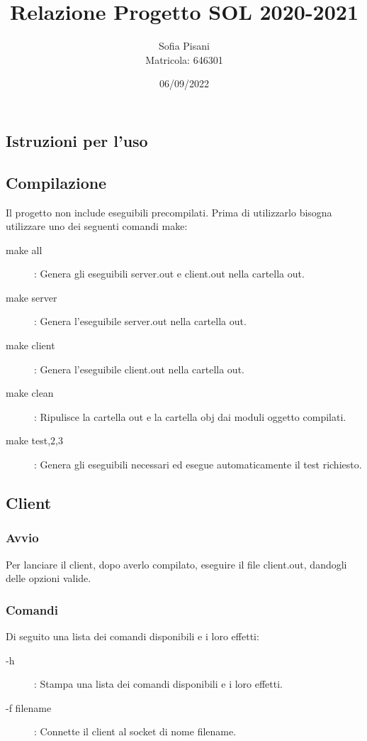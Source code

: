 \documentclass[11pt]{article}
\title{Relazione Progetto SOL 2020-2021}
\date{06/09/2022}
\author{Sofia Pisani \\ Matricola: 646301}
\begin{document}
\maketitle
{}
\newpage
\tableofcontents
\newpage
{}
\begin{flushleft}
\section{Istruzioni per l'uso}
\subsection{Compilazione}
Il progetto non include eseguibili precompilati. Prima di utilizzarlo bisogna utilizzare uno dei seguenti comandi make:
\begin{description}
\item[make all] : Genera gli eseguibili server.out e client.out nella cartella out.
\item[make server] : Genera l'eseguibile server.out nella cartella out.
\item[make client] : Genera l'eseguibile client.out nella cartella out.
\item[make clean] : Ripulisce la cartella out e la cartella obj dai moduli oggetto compilati.
\item[make test,2,3\rbrack]: Genera gli eseguibili necessari ed esegue automaticamente il test richiesto.
\end{description}
\subsection{Client}
\subsubsection{Avvio}
Per lanciare il client, dopo averlo compilato, eseguire il file client.out, dandogli delle opzioni valide.
\subsubsection{Comandi}
Di seguito una lista dei comandi disponibili e i loro effetti:
\begin{description}

\item[-h] : Stampa una lista dei comandi disponibili e i loro effetti.

\item[-f filename]: Connette il client al socket di nome filename.


\end{description}
\end{flushleft}
\end{document}
